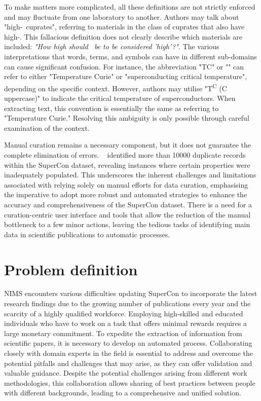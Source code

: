 To make matters more complicated, all these definitions are not strictly enforced and may fluctuate from one laboratory to another. 
Authors may talk about "high-\tc~cuprates", referring to materials in the class of cuprates that also have high-\tc. This fallacious definition does not clearly describe which materials are included: \textit{"How high should \tc~be to be considered 'high'?"}.
The various interpretations that words, terms, and symbols can have in different sub-domains can cause significant confusion. For instance, the abbreviation "TC" or "\tc" can refer to either "Temperature Curie" or "superconducting critical temperature", depending on the specific context. However, authors may utilise "T\textsuperscript{C} (C uppercase)" to indicate the critical temperature of superconductors. When extracting text, this convention is essentially the same as referring to "Temperature Curie." Resolving this ambiguity is only possible through careful examination of the context.

Manual curation remains a necessary component, but it does not guarantee the complete elimination of errors. ~\cite{sommer20223dsc} identified more than 10000 duplicate records within the SuperCon dataset, revealing instances where certain properties were inadequately populated. 
This underscores the inherent challenges and limitations associated with relying solely on manual efforts for data curation, emphasising the imperative to adopt more robust and automated strategies to enhance the accuracy and comprehensiveness of the SuperCon dataset.
There is a need for a curation-centric user interface and tools that allow the reduction of the manual bottleneck to a few minor actions, leaving the tedious tasks of identifying main data in scientific publications to automatic processes.


\section{Problem definition}

NIMS encounters various difficulties updating SuperCon to incorporate the latest research findings due to the growing number of publications every year and the scarcity of a highly qualified workforce. 
Employing high-skilled and educated individuals who have to work on a task that offers minimal rewards requires a large monetary commitment.
To expedite the extraction of information from scientific papers, it is necessary to develop an automated process.
Collaborating closely with domain experts in the field is essential to address and overcome the potential pitfalls and challenges that may arise, as they can offer validation and valuable guidance.
Despite the potential challenges arising from different work methodologies, this collaboration allows sharing of best practices between people with different backgrounds, leading to a comprehensive and unified solution.

